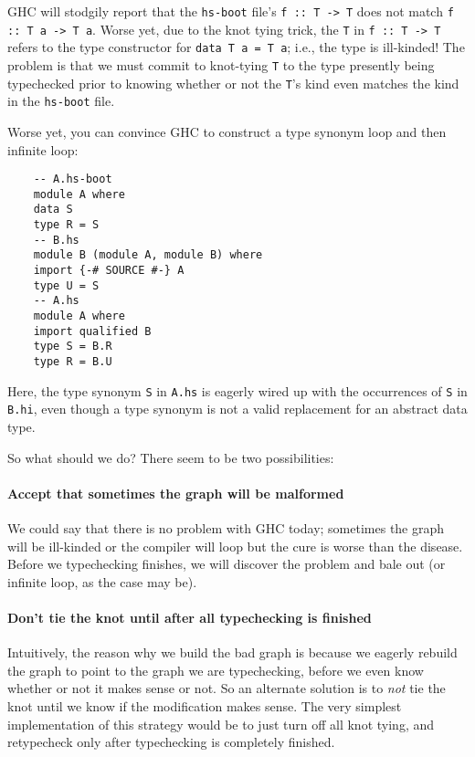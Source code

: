 GHC will stodgily report that the \verb|hs-boot| file's
\verb|f :: T -> T| does not match \verb|f :: T a -> T a|.
Worse yet, due to the knot tying trick, the \verb|T| in
\verb|f :: T -> T| refers to the type constructor for
\verb|data T a = T a|; i.e., the type is ill-kinded!
The problem is that we must commit to knot-tying \verb|T| to
the type presently being typechecked prior to
knowing whether or not the \verb|T|'s kind even matches the
kind in the \verb|hs-boot| file.

Worse yet, you can convince GHC to construct a type synonym
loop and then infinite loop:

\begin{verbatim}
    -- A.hs-boot
    module A where
    data S
    type R = S
    -- B.hs
    module B (module A, module B) where
    import {-# SOURCE #-} A
    type U = S
    -- A.hs
    module A where
    import qualified B
    type S = B.R
    type R = B.U
\end{verbatim}

Here, the type synonym \verb|S| in \verb|A.hs| is eagerly wired up
with the occurrences of \verb|S| in \verb|B.hi|, even though
a type synonym is not a valid replacement for an abstract
data type.

So what should we do?  There seem to be two possibilities:

\paragraph{Accept that sometimes the graph will be malformed}  We could
say that there is no problem with GHC today; sometimes the graph will be
ill-kinded or the compiler will loop but the cure is worse than the
disease.  Before we typechecking finishes, we will discover the problem
and bale out (or infinite loop, as the case may be).

\paragraph{Don't tie the knot until after all typechecking is finished}
Intuitively, the reason why we build the bad graph is because we
eagerly rebuild the graph to point to the graph we are typechecking,
before we even know whether or not it makes sense or not.  So an
alternate solution is to \emph{not} tie the knot until we know
if the modification makes sense.  The very simplest implementation
of this strategy would be to just turn off all knot tying, and
retypecheck only after typechecking is completely finished.

